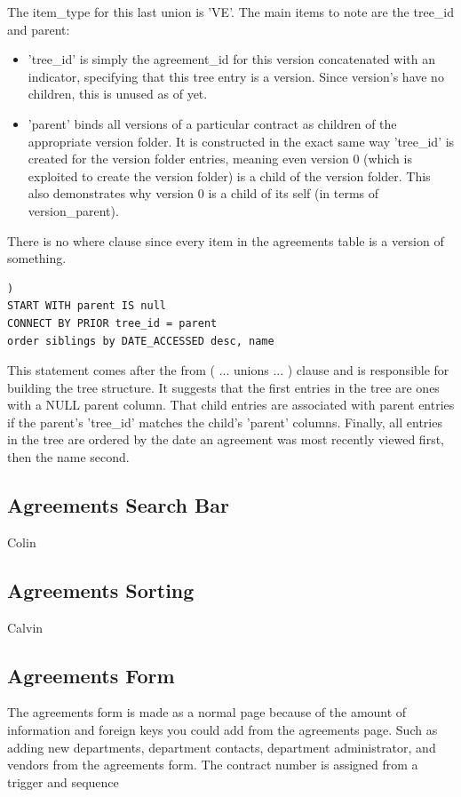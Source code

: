 \documentclass{report}
\begin{document}
The item\_type for this last union is 'VE'.  The main items to note are the tree\_id and parent:

\begin{itemize}
	\item 'tree\_id' is simply the agreement\_id for this version concatenated with an indicator, specifying that this tree entry is a version.  Since version's have no children, this is unused as of yet.
	\item 'parent' binds all versions of a particular contract as children of the appropriate version folder.  It is constructed in the exact same way 'tree\_id' is created for the version folder entries, meaning even version 0 (which is exploited to create the version folder) is a child of the version folder.  This also demonstrates why version 0 is a child of its self (in terms of version\_parent).
\end{itemize}

There is no where clause since every item in the agreements table is a version of something.

\begin{lstlisting}[caption=final pieces of the initial select statement creating the tree structure.]
)
START WITH parent IS null
CONNECT BY PRIOR tree_id = parent
order siblings by DATE_ACCESSED desc, name
\end{lstlisting}

This statement comes after the from ( ... unions ... ) clause and is responsible for building the tree structure.  It suggests that the first entries in the tree are ones with a NULL parent column.  That child entries are associated with parent entries if the parent's 'tree\_id' matches the child's 'parent' columns.  Finally, all entries in the tree are ordered by the date an agreement was most recently viewed first, then the name second.

\subsection{Agreements Search Bar}
Colin 

\subsection{Agreements Sorting}
Calvin

\subsection{Agreements Form}
The agreements form is made as a normal page because of the amount of information and foreign keys you could add from the agreements page. Such as adding new departments, department contacts, department administrator, and vendors from the agreements form. The contract number is assigned from a trigger and sequence
\end{document}
